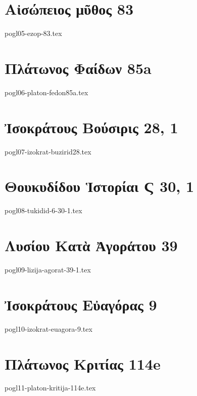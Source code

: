 \documentclass[a4paper,12pt,twoside]{report}
\begin{document}
\chapter[Αἰσώπειος μῦθος 83]{\textgreek[variant=ancient]{Αἰσώπειος μῦθος} 83}

{pogl05-ezop-83.tex}

\chapter[Πλάτωνος Φαίδων]{\textgreek[variant=ancient]{Πλάτωνος Φαίδων} 85a}

{pogl06-platon-fedon85a.tex}

\chapter[Ἰσοκράτους Βούσιρις]{\textgreek[variant=ancient]{Ἰσοκράτους Βούσιρις} 28, 1}

{pogl07-izokrat-buzirid28.tex}

\chapter[Θουκυδίδου Ἱστορίαι Ϛ]{\textgreek[variant=ancient]{Θουκυδίδου Ἱστορίαι Ϛ} 30, 1}

{pogl08-tukidid-6-30-1.tex}

\chapter[Λυσίου Κατὰ Ἀγοράτου]{\textgreek[variant=ancient]{Λυσίου Κατὰ Ἀγοράτου} 39}

{pogl09-lizija-agorat-39-1.tex}

\chapter[Ἰσοκράτους Εὐαγόρας]{\textgreek[variant=ancient]{Ἰσοκράτους Εὐαγόρας} 9}

{pogl10-izokrat-euagora-9.tex}

\chapter[Πλάτωνος Κριτίας]{\textgreek[variant=ancient]{Πλάτωνος Κριτίας} 114e}

{pogl11-platon-kritija-114e.tex}
\end{document}

